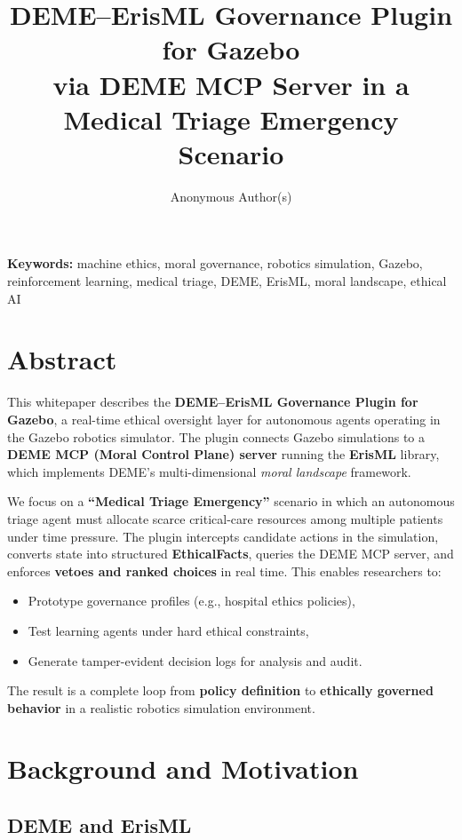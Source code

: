 \documentclass[11pt]{article}
\title{\textbf{DEME--ErisML Governance Plugin for Gazebo}\\[0.5em]
\large via DEME MCP Server in a Medical Triage Emergency Scenario}
\author{Anonymous Author(s)}
\date{}
\begin{document}
\maketitle

\noindent\textbf{Keywords:} machine ethics, moral governance, robotics simulation, Gazebo, reinforcement learning, medical triage, DEME, ErisML, moral landscape, ethical AI

\section{Abstract}

This whitepaper describes the \textbf{DEME--ErisML Governance Plugin for Gazebo}, a real-time ethical oversight layer for autonomous agents operating in the Gazebo robotics simulator. The plugin connects Gazebo simulations to a \textbf{DEME MCP (Moral Control Plane) server} running the \textbf{ErisML} library, which implements DEME's multi-dimensional \emph{moral landscape} framework.

We focus on a \textbf{``Medical Triage Emergency''} scenario in which an autonomous triage agent must allocate scarce critical-care resources among multiple patients under time pressure. The plugin intercepts candidate actions in the simulation, converts state into structured \textbf{EthicalFacts}, queries the DEME MCP server, and enforces \textbf{vetoes and ranked choices} in real time. This enables researchers to:

\begin{itemize}
  \item Prototype governance profiles (e.g., hospital ethics policies),
  \item Test learning agents under hard ethical constraints,
  \item Generate tamper-evident decision logs for analysis and audit.
\end{itemize}

The result is a complete loop from \textbf{policy definition} to \textbf{ethically governed behavior} in a realistic robotics simulation environment.

\section{Background and Motivation}

\subsection{DEME and ErisML}
\end{document}
